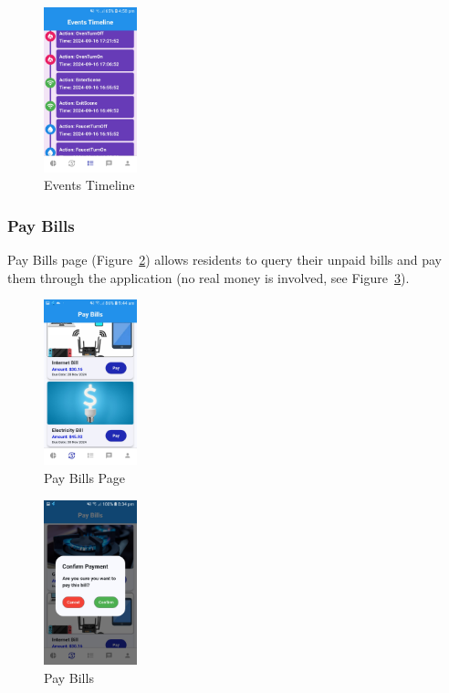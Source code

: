 \documentclass[sigconf]{acmart}
\begin{document}
\begin{figure}[h]
  \centering
  \includegraphics[width=0.24\textwidth]{actionTimeline.jpg}
  \caption{Events Timeline}
  \label{fig:actionTimeline}
\end{figure}

\subsubsection{Pay Bills}
Pay Bills page (Figure~\ref{fig:unpaidBills}) allows residents to query their unpaid bills and pay them through the application (no real money is involved, see Figure~\ref{fig:payBill}).

\begin{figure}[h]
  \centering
  \includegraphics[width=0.24\textwidth]{unpaidBills.jpg}
  \caption{Pay Bills Page}
  \label{fig:unpaidBills}
\end{figure}
\begin{figure}[h]
  \centering
  \includegraphics[width=0.24\textwidth]{payBill.jpg}
  \caption{Pay Bills}
  \label{fig:payBill}
\end{figure}
\end{document}

